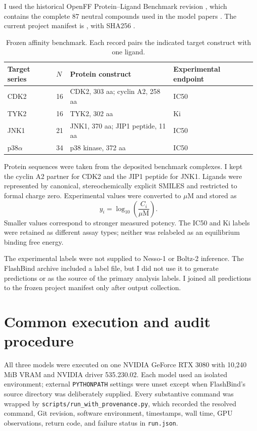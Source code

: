 \documentclass[11pt]{article}
\begin{document}
I used the historical OpenFF Protein--Ligand Benchmark revision
\texttt{}, which contains the complete
87 neutral compounds used in the model papers \citep{hahn2022bindingbenchmarks}.
The current project manifest is
, with SHA256
\texttt{}.

\begin{table}[H]
\centering
\small
\begin{tabular}{L{1.35in}C{0.65in}L{2.55in}L{0.95in}}
\toprule
Target series & $N$ & Protein construct & Experimental endpoint \\
\midrule
CDK2 & 16 & CDK2, 303 aa; cyclin A2, 258 aa & IC50 \\
TYK2 & 16 & TYK2, 302 aa & Ki \\
JNK1 & 21 & JNK1, 370 aa; JIP1 peptide, 11 aa & IC50 \\
p38$\alpha$ & 34 & p38 kinase, 372 aa & IC50 \\
\bottomrule
\end{tabular}
\caption{Frozen affinity benchmark. Each record pairs the indicated target
construct with one ligand.}
\end{table}

Protein sequences were taken from the deposited benchmark complexes. I kept
the cyclin A2 partner for CDK2 and the JIP1 peptide for JNK1. Ligands were
represented by canonical, stereochemically explicit SMILES and restricted to
formal charge zero. Experimental values were converted to $\mu$M and stored as
\[
  y_i=\log_{10}\!\left(\frac{C_i}{\mu\mathrm{M}}\right).
\]
Smaller values correspond to stronger measured potency. The IC50 and Ki labels
were retained as different assay types; neither was relabeled as an
equilibrium binding free energy.

The experimental labels were not supplied to Nesso-1 or Boltz-2 inference.
The FlashBind archive included a label file, but I did not use it to generate
predictions or as the source of the primary analysis labels. I joined all
predictions to the frozen project manifest only after output collection.

\section{Common execution and audit procedure}

All three models were executed on one NVIDIA GeForce RTX 3080 with 10,240 MiB
VRAM and NVIDIA driver 535.230.02. Each model used an isolated environment;
external \texttt{PYTHONPATH} settings were unset except when FlashBind's source
directory was deliberately supplied. Every substantive command was wrapped by
\texttt{scripts/run\_with\_provenance.py}, which recorded the resolved command,
Git revision, software environment, timestamps, wall time, GPU observations,
return code, and failure status in \texttt{run.json}.
\end{document}
